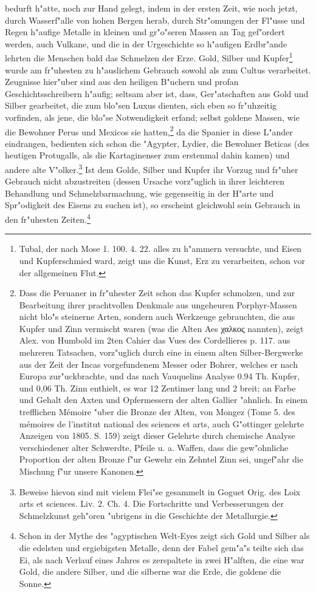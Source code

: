 \documentclass[a4paper, 11pt, oneside, polutonikogreek, german]{article}
\begin{document}
bedurft h"atte, noch zur Hand gelegt, indem in der ersten Zeit, wie noch jetzt, durch Wasserf"alle von hohen Bergen herab, durch Str"omungen der Fl"usse und Regen h"aufige Metalle in kleinen und gr"o"seren Massen an Tag gef"ordert werden, auch Vulkane, und die in der Urgeschichte so h"aufigen Erdbr"ande lehrten die Menschen bald das Schmelzen der Erze. Gold, Silber und Kupfer\footnote{Tubal, der nach Mose 1. 100. 4. 22. alles zu h"ammern versuchte, und Eisen und Kupferschmied ward, zeigt uns die Kunst, Erz zu verarbeiten, schon vor der allgemeinen Flut.} wurde am fr"uhesten zu h"auslichem Gebrauch sowohl als zum Cultus verarbeitet. Zeugnisse hier"uber sind aus den heiligen B"uchern und profan Geschichtsschreibern h"aufig; seltsam aber ist, dass, Ger"atschaften aus Gold und Silber gearbeitet, die zum blo"sen Luxus dienten, sich eben so fr"uhzeitig vorfinden, als jene, die blo"se Notwendigkeit erfand; selbst goldene Massen, wie die Bewohner Perus und Mexicos sie hatten,\footnote{Dass die Peruaner in fr"uhester Zeit schon das Kupfer schmolzen, und zur Bearbeitung ihrer prachtvollen Denkmale aus ungeheuren Porphyr-Massen nicht blo"s steinerne Arten, sondern auch Werkzeuge gebrauchten, die aus Kupfer und Zinn vermischt waren (was die Alten Aes χαλκος nannten), zeigt Alex. von Humbold im 2ten Cahier das Vues des Cordellieres p. 117. aus mehreren Tatsachen, vorz"uglich durch eine in einem alten Silber-Bergwerke aus der Zeit der Incas vorgefundenem Messer oder Bohrer, welches er nach Europa zur"uckbrachte, und das nach Vauquelins Analyse 0.94 Th. Kupfer, und 0,06 Th. Zinn enthielt, es war 12 Zentimer lang und 2 breit; an Farbe und Gehalt den Axten und Opfermessern der alten Gallier "ahnlich. In einem trefflichen Mémoire "uber die Bronze der Alten, von Mongez (Tome 5. des mémoires de l'institut national des sciences et arts, auch G"ottinger gelehrte Anzeigen von 1805. S. 159) zeigt dieser Gelehrte durch chemische Analyse verschiedener alter Schwerdte, Pfeile u. a. Waffen, dass die gew"ohnliche Proportion der alten Bronze f"ur Gewehr ein Zehntel Zinn sei, ungef"ahr die Mischung f"ur unsere Kanonen.} da die Spanier in diese L"ander eindrangen, bedienten sich schon die "Agypter, Lydier, die Bewohner Beticas (des heutigen Protugalls, als die Kartaginenser zum erstenmal dahin kamen) und andere alte V"olker.\footnote{Beweise hievon sind mit vielem Flei"se gesammelt in Goguet Orig. des Loix arts et sciences. Liv. 2. Ch. 4. Die Fortschritte und Verbesserungen der Schmelzkunst geh"oren "ubrigens in die Geschichte der Metallurgie.} Ist dem Golde, Silber und Kupfer ihr Vorzug und fr"uher Gebrauch nicht abzustreiten (dessen Ursache vorz"uglich in ihrer leichteren Behandlung und Schmelzbarmachung, wie gegenseitig in der H"arte und Spr"odigkeit des Eisens zu suchen ist), so erscheint gleichwohl sein Gebrauch in den fr"uhesten Zeiten.\footnote{Schon in der Mythe des "agyptischen Welt-Eyes zeigt sich Gold und Silber als die edelsten und ergiebigsten Metalle, denn der Fabel gem"a"s teilte sich das Ei, als nach Verlauf eines Jahres es zerspaltete in zwei H"alften, die eine war Gold, die andere Silber, und die silberne war die Erde, die goldene die Sonne.}
\end{document}
